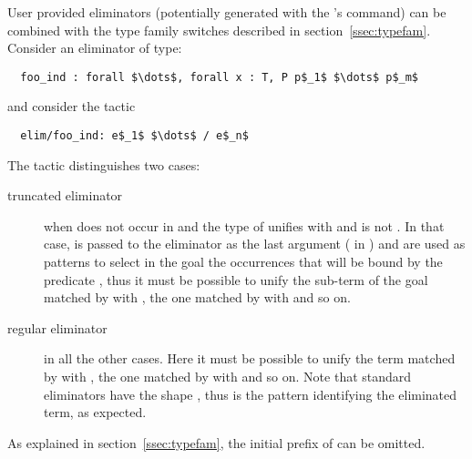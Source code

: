 User provided eliminators (potentially generated with the
 \Coq{}'s command) can be combined with the type family switches
described in section~\ref{ssec:typefam}. Consider an eliminator
 of type:
\begin{lstlisting}
  foo_ind : forall $\dots$, forall x : T, P p$_1$ $\dots$ p$_m$
\end{lstlisting}
and consider the tactic
\begin{lstlisting}
  elim/foo_ind: e$_1$ $\dots$ / e$_n$
\end{lstlisting}
The  tactic distinguishes two cases:
\begin{description}
\item[truncated eliminator] when  does not occur in 
  and the type of  unifies with  and  is not \C{_}.
  In that case,  is passed to the eliminator as the last argument
  ( in ) and  are used as patterns
  to select in the goal the occurrences that will be bound by the
  predicate , thus it must be possible to unify the sub-term of
  the goal matched by  with , the one matched by
   with  and so on.
\item[regular eliminator] in all the other cases. Here it must be
  possible to unify the term matched by
   with , the one matched by
   with  and so on. Note that
  standard eliminators have the shape , thus
   is the pattern identifying the eliminated term, as expected.
\end{description}
As explained in  section~\ref{ssec:typefam}, the initial prefix of
 can be omitted.

